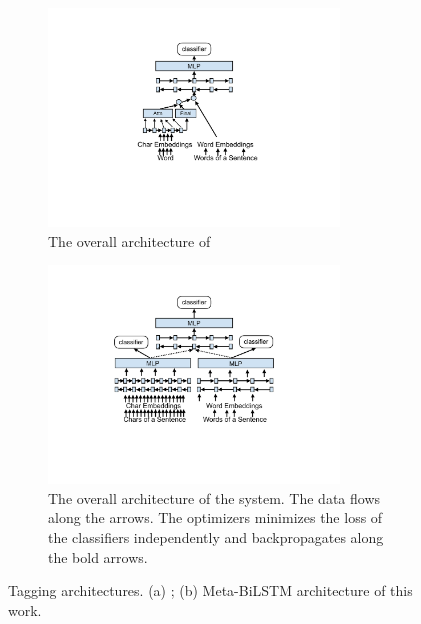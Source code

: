 \documentclass[11pt,a4paper]{article}
\begin{document}
\begin{figure}[t!]
\begin{subfigure}[t]{0.5\textwidth}
\centering\includegraphics[clip, trim=8cm 7.5cm 9cm 2.5cm, width=0.85\textwidth]{architecture_dm2.pdf}
\caption{The overall architecture of }
\label{figure:architecture-dm}
\end{subfigure}
\begin{subfigure}[t]{0.5\textwidth}
\centering\includegraphics[clip, trim=8cm 7cm 8cm 2.5cm, width=0.85\textwidth]{architecture_4.pdf}
\caption{The overall architecture of the system. The data flows along the arrows. The optimizers minimizes the loss of the classifiers independently and backpropagates along the bold arrows.}
\label{figure:architecture}
\end{subfigure}
\caption{Tagging architectures. (a) ; (b) Meta-BiLSTM architecture of this work.}
\end{figure}
\end{document}
